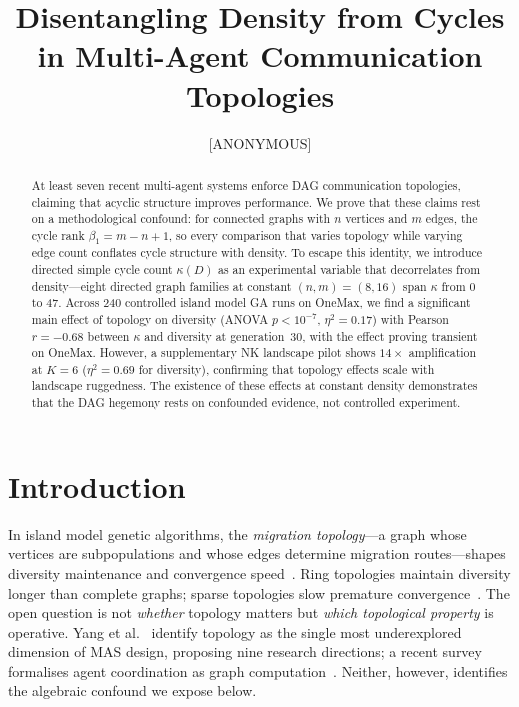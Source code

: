 \documentclass{llncs}
\begin{document}
\title{Disentangling Density from Cycles\\in Multi-Agent Communication Topologies}
\author{[ANONYMOUS]}
\institute{[ANONYMOUS]}
\maketitle

\begin{abstract}
At least seven recent multi-agent systems enforce DAG communication topologies,
claiming that acyclic structure improves performance. We prove that these claims
rest on a methodological confound: for connected graphs with $n$ vertices and $m$
edges, the cycle rank $\beta_1 = m - n + 1$, so every comparison that varies
topology while varying edge count conflates cycle structure with density. To
escape this identity, we introduce directed simple cycle count $\kappa(D)$ as an
experimental variable that decorrelates from density---eight directed graph
families at constant $(n, m) = (8, 16)$ span $\kappa$ from 0 to 47. Across 240
controlled island model GA runs on OneMax, we find a significant main effect of
topology on diversity (ANOVA $p < 10^{-7}$, $\eta^2 = 0.17$) with Pearson
$r = -0.68$ between $\kappa$ and diversity at generation~30, with the effect
proving transient on OneMax. However, a supplementary NK
landscape pilot shows $14\times$ amplification at $K = 6$ ($\eta^2 = 0.69$
for diversity), confirming that topology effects scale with landscape
ruggedness. The existence of these effects at constant density demonstrates
that the DAG hegemony rests on confounded evidence, not controlled experiment.
\end{abstract}

\section{Introduction}
\label{sec:intro}

In island model genetic algorithms, the \emph{migration topology}---a graph
whose vertices are subpopulations and whose edges determine migration
routes---shapes diversity maintenance and convergence
speed~\cite{tomassini2005spatially,alba1999parallel}. Ring topologies maintain
diversity longer than complete graphs; sparse topologies slow premature
convergence~\cite{alba2002parallel,skolicki2005influence}. The open question is
not \emph{whether} topology matters but \emph{which topological property} is
operative. Yang et al.~\cite{yang2025topology} identify topology as the single
most underexplored dimension of MAS design, proposing nine research directions;
a recent survey formalises agent coordination as graph
computation~\cite{graphsaiagents2025}. Neither, however, identifies the
algebraic confound we expose below.
\end{document}
